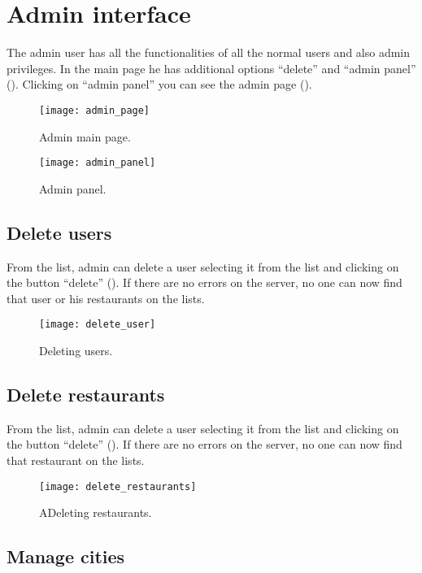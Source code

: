 \section{Admin interface}

The admin user has all the functionalities of all the normal users and also
admin privileges. In the main page he has additional options ``delete'' and
``admin panel'' (). Clicking on ``admin panel'' you can
see the admin page ().

\begin{figure}[H]
	\texttt{[image: admin\_page]}
	\caption{Admin main page.}\label{fig:admin_page}
\end{figure}

\begin{figure}[H]
	\texttt{[image: admin\_panel]}
	\caption{Admin panel.}\label{fig:admin_panel}
\end{figure}

\subsection{Delete users}

From the list, admin can delete a user selecting it from the list and clicking
on the button ``delete'' (). If there are no errors on
the server, no one can now find that user or his restaurants on the lists.

\begin{figure}[H]
	\texttt{[image: delete\_user]}
	\caption{Deleting users.}\label{fig:delete_user}
\end{figure}

\subsection{Delete restaurants}

From the list, admin can delete a user selecting it from the list and clicking
on the button ``delete'' (). If there are no
errors on the server, no one can now find that restaurant on the lists.

\begin{figure}[H]
	\texttt{[image: delete\_restaurants]}
	\caption{ADeleting restaurants.}\label{fig:delete_restaurants}
\end{figure}

\subsection{Manage cities}

